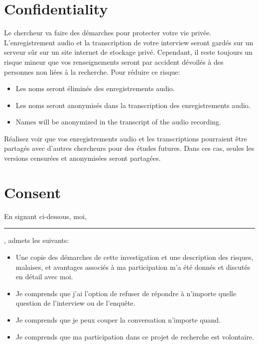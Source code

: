 \documentclass{article}
\begin{document}
    \section{Confidentiality}
      Le chercheur va faire des démarches pour protecter votre vie privée.
      L'enregistrement audio et la transcription de votre interview seront gardés sur un serveur sûr sur un site internet de stockage privé.
      Cependant, il reste toujours un risque mineur que vos renseignements seront par accident dévoilés à des personnes non liées à la recherche.
      Pour réduire ce risque:
      \begin{itemize}
        \item Les noms seront éliminés des enregistrements audio.
        \item Les noms seront anonymisés dans la transcription des enregistrements audio.
        \item Names will be anonymized in the transcript of the audio recording.
      \end{itemize}
      Réalisez voir que vos enregistrements audio et les transcriptions pourraient être partagés avec d'autres chercheurs pour des études futures.
      Dans ces cas, seules les versions censurées et anonymisées seront partagées.

    \section{Consent}
      En signant ci-dessous, moi, \rule{3cm}{0.4pt}, admets les suivants:
      \begin{itemize}
        \item Une copie des démarches de cette investigation et une description des risques, malaises, et avantages associés à ma participation m'a été donnés et discutés en détail avec moi.
        \item Je comprends que j'ai l'option de refuser de répondre à n'importe quelle question de l'interview ou de l'enquête.
        \item Je comprends que je peux couper la conversation n'importe quand.
        \item Je comprends que ma participation dans ce projet de recherche est volontaire.
      \end{itemize}
\end{document}
